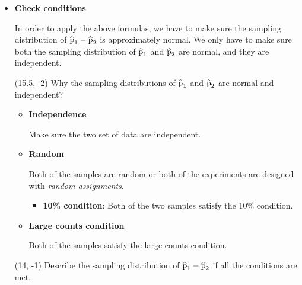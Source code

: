 \documentclass[a4paper, 12pt,twoside]{book}
\newcommand\reallywidehat[1]{%
\savestack{\tmpbox}{\stretchto{%
  \scaleto{%
    \scalerel*[\widthof{\ensuremath{#1}}]{\kern-.6pt\bigwedge\kern-.6pt}%
    {\rule[-\textheight/2]{1ex}{\textheight}}%
  }{\textheight}%
}{0.5ex}}%
\stackon[1pt]{#1}{\tmpbox}%
}
\begin{document}
 \begin{itemize}
    \item \textbf{Check conditions}\vspace{0.3cm}
    
    In order to apply the above formulas, we have to make sure the sampling distribution of $\reallywidehat{p}_1- \reallywidehat{p}_2$ is approximately normal. We only have to make sure both the sampling distribution of $\reallywidehat{p}_1$ and $\reallywidehat{p}_2$ are normal, and they are independent. 
    
    \begin{textblock}{3}(15.5, -2)
    Why the sampling distributions of $\reallywidehat{p}_1$ and $\reallywidehat{p}_2$ are normal and independent?
    \end{textblock}
    
    \begin{itemize}
     \item \textbf{Independence}\vspace{0.3cm}
     
     Make sure the two set of data are independent.\vspace{0.3cm}
     
     \item\textbf{Random} \vspace{0.3cm}
     
     Both of the samples are random or both of the experiments are designed with \textit{random assignments}.
          \begin{itemize}
              \item \textbf{10\% condition}: Both of the two samples satisfy the 10\% condition.
          \end{itemize}
          
     \item \textbf{Large counts condition}\vspace{0.3cm}
      
      Both of the samples satisfy the large counts condition.
      
    \end{itemize}
    
            \begin{textblock}{4}(14, -1) 
    Describe the sampling distribution of $\reallywidehat{p}_1 - \reallywidehat{p}_2 $ if all the conditions are met.
   \end{textblock}
  

\end{itemize}
\end{document}
